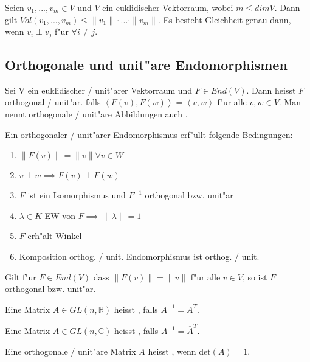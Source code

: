 \documentclass[8pt, a4paper, twocolumn, landscape]{article}
\begin{document}
\begin{theorem}
Seien $v_1, ..., v_m \in V$ und $V$ ein euklidischer Vektorraum, wobei $m \leq dim V$. Dann gilt
$
Vol(v_1, ..., v_m) \leq \|v_1\| \cdot ... \cdot \|v_m\|.
$
Es besteht Gleichheit genau dann, wenn $v_i \perp v_j$ f"ur $\forall i \neq j$.


\end{theorem}

\subsection{Orthogonale und unit"are Endomorphismen}
\begin{definition}
Sei V ein euklidischer / unit"arer Vektorraum und $F \in End(V)$. Dann heisst $F$ orthogonal / unit"ar. falls
$
\left\langle F(v), F(w) \right\rangle = \left\langle v, w \right\rangle
$ f"ur alle $v, w \in V$. Man nennt orthogonale / unit"are Abbildungen auch .
\end{definition}

\begin{remark}
Ein orthogonaler / unit"arer Endomorphismus erf"ullt folgende Bedingungen:
\vspace{-20pt}
\begin{multicols}{2}
\begin{enumerate}
\item $\| F(v) \| = \|v\| \forall v \in W$
\item $ v \perp w \implies F(v) \perp F(w)$
\item $F$ ist ein Isomorphismus und $F^{-1}$ orthogonal bzw. unit"ar
\item $\lambda \in K$ EW von $F \implies \ \|\lambda \| = 1$
\item $F$ erh"alt Winkel
\item Komposition orthog. / unit. Endomorphismus ist orthog. / unit.
\end{enumerate}
\end{multicols}
\end{remark}

\begin{lemma}
Gilt f"ur $F \in End(V)$ dass $\|F(v)\| = \|v\|$ f"ur alle $v \in V$, so ist $F$ orthogonal bzw. unit"ar.
\end{lemma}

\begin{definition}
Eine Matrix $A \in GL(n, \mathbb{R})$ heisst , falls
$
A^{-1} = A^T.
$

Eine Matrix $A \in GL(n, \mathbb{C})$ heisst , falls
$
A^{-1} = \overline{A}^T.
$

Eine orthogonale / unit"are Matrix $A$ heisst , wenn $\mathrm{det}(A) = 1$.
\end{definition}
\end{document}
